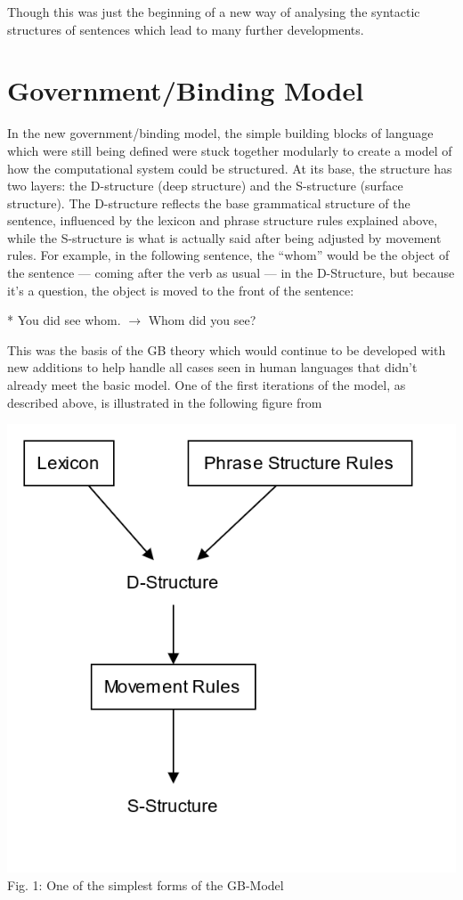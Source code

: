 \documentclass[a4paper,10pt]{article}
\begin{document}
Though this was just the beginning of a new way of analysing the syntactic structures of sentences
which lead to many further developments.


\section{Government/Binding Model}
In the new government/binding model, the simple building blocks of language which were still being
defined were stuck together modularly to create a model of how the computational system could be
structured. At its base, the structure has two layers: the D-structure (deep structure) and the
S-structure (surface structure). The D-structure reflects the base grammatical structure of the
sentence, influenced by the lexicon and phrase structure rules explained above, while the S-structure
is what is actually said after being adjusted by movement rules. \citep[p.~61]{ChUGAI}
For example, in the following sentence, the ``whom'' would be the object of the sentence --- coming
after the verb as usual --- in the D-Structure, but because it's a question, the object is moved
to the front of the sentence:

\begin{center}
	* You did see whom. $\rightarrow$ Whom did you see?
\end{center}

This was the basis of the GB theory which would continue to be developed with new additions to
help handle all cases seen in human languages that didn't already meet the basic model. One of
the first iterations of the model, as described above, is illustrated in the following figure
from \citet[p.~62]{ChUGAI}

\begin{center}
	\includegraphics[scale=0.25]{gb-model-init.png}
	\linebreak
	Fig. 1: One of the simplest forms of the GB-Model
\end{center}
\end{document}
